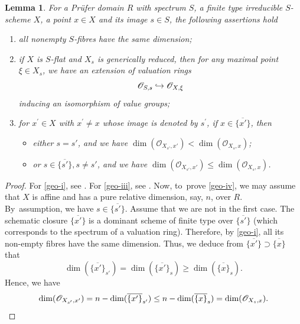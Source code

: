 \documentclass[JEP,XML,SOM,Unicode,published]{cedram}
\newenvironment{enumeratei}
{\bgroup\def\theenumi{\roman{enumi}}\def\theenumii{\arabic{enumii}}\begin{enumerate}}
{\end{enumerate}\egroup}
\newcommand\hto{\mathrel{\lhook\joinrel\to}}
\newcommand{\sO}{\mathscr{O}}
\let\hra\hto
\newcommand{\pr}{^{\prime}}
\newcommand{\bpf}{\begin{proof}}
\newcommand{\epf}{\end{proof}}
\newcommand{\blem}{\begin{lemma}}
\newcommand{\elem}{\end{lemma}}
\newcommand{\benumr}{\begin{enumeratei}}
\newcommand{\eenumr}{\end{enumeratei}}
\theoremstyle{plain}
\newtheorem{lemma}[subsection]{Lemma}
\theoremstyle{definition}
\begin{document}
\blem\label{geom}
For a Prüfer domain $R$ with spectrum $S$, a finite type irreducible $S$-scheme $X$, a point $x\in X$ and its image $s\in S$, the following assertions hold
\benumr
\item\label{geo-i} all nonempty $S$-fibres have the same dimension;
\item\label{geo-iii} if $X$ is $S$-flat and $X_s$ is generically reduced, then for any maximal point $\xi\in X_s$, we have an extension of valuation rings
\[
\sO_{S,s}\hra \sO_{X,\xi}
\]
inducing an isomorphism of value groups;
\item\label{geo-iv} for $x\pr\in X$ with $x\pr \neq x$ whose image is denoted by $s\pr$, if $x\in \overline{\{x'\}}$, then
\begin{itemize}
\item {either $s=s'$}, and we have $\dim (\sO_{X_{s'},x'}) <\dim(\sO_{X_s,x})$;
\item or {$s\in \overline{\{s'\}}, s\neq s'$}, and we have $\dim (\sO_{X_{s'},x'}) \le \dim(\sO_{X_s,x})$.
\end{itemize}
\eenumr
\elem
\bpf
For \eqref{geo-i}, see \cite[Lem.\,14.3.10]{EGAIV3}.
For \eqref{geo-iii}, see \cite[Th.\,A]{MB22}.
Now, to~prove \eqref{geo-iv}, we may assume that $X$ is affine and has a pure relative dimension, say, $n$, over $R$.
By~assumption, we have $s\in \overline{\{s'\}}$. Assume that we are not in the first case. The schematic closure $\overline{\{x'\}}$ is a dominant scheme of finite type over $\overline{\{s'\}}$ (which corresponds to the spectrum of a valuation ring). Therefore, by \eqref{geo-i}, all its non-empty fibres have the same dimension. Thus, we deduce from $\overline{\{x'\}} \supset \overline{\{x\}}$ that
\[
\dim (\overline{\{x'\}}_{s'}) = \dim (\overline{\{x'\}}_{s}) \ge \dim (\overline{\{x\}}_{s}).
\]
Hence, we have
\[
\dim (\sO_{X_{s'},x'})= n-\dim (\overline{\{x'\}}_{s'}) \le n-\dim (\overline{\{x\}}_{s}) = \dim(\sO_{X_s,x}). \qedhere
\]
\epf
\end{document}

